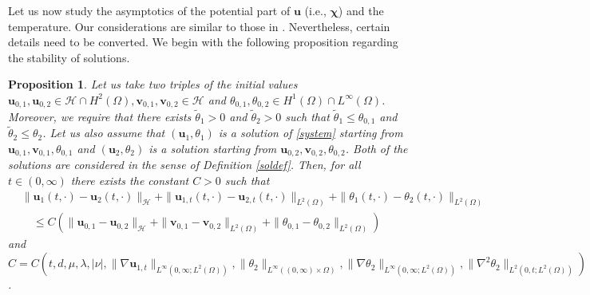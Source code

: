 \documentclass[11pt]{article}
\numberwithin{equation}{section}
\theoremstyle{plain}
\newtheorem{prop}[defi]{Proposition}
\newcommand\bb[1]{\mathbf{#1}}
\newcommand{\tn}{\Omega}
\newcommand{\htwo}{H^2(\Omega)}
\renewcommand{\hom}{H^1(\tn)}
\newcommand{\ld}{L^2(\Omega)}
\newcommand{\bu}{\bb{u}}
\newcommand{\bs}[1]{\boldsymbol{#1}}
\renewcommand{\H}{\mathcal{H}}
\begin{document}
Let us now study the asymptotics of the potential part of $\bu$ (i.e., $\bs\chi$) and the temperature. Our considerations are similar to those in \cite{BC2, Biest}. Nevertheless, certain details need to be converted. We begin with the following proposition regarding the stability of solutions.
\begin{prop}\label{twcontdep}
Let us take two triples of the initial values $\bu_{0,1},\bu_{0,2}\in \H\cap\htwo, \bb v_{0,1},\bb v_{0,2}\in\H$ and $\theta_{0,1},\theta_{0,2}\in\hom\cap L^{\infty}(\tn)$. Moreover, we  require that there exists $\tilde\theta_1>0$ and $\tilde\theta_2>0$ such that $\tilde\theta_1\leq\theta_{0,1}$ and $\tilde\theta_2\leq\theta_2$.
Let us also assume that $(\bu_1,\theta_1)$ is a solution of \eqref{system} starting from $\bu_{0,1},\bb v_{0,1},\theta_{0,1}$ and $(\bu_2,\theta_2)$ is a
solution starting from $\bu_{0,2},\bb v_{0,2},\theta_{0,2}$. Both of the solutions are considered in the sense of Definition \ref{soldef}. Then, for all $t\in(0,\infty)$ there exists the constant $C>0$  such that
\begin{align*}
&\|\bu_1(t,\cdot)-\bu_2(t,\cdot)\|_{\H}+\|\bu_{1,t}(t,\cdot)-\bu_{2,t}(t,\cdot)\|_{\ld}+\|\theta_1(t,\cdot)-\theta_2(t,\cdot)\|_{\ld}\\
&\quad\leq C\left(\|\bu_{0,1}-\bu_{0,2}\|_{\H}+\|\bb v_{0,1}-\bb v_{0,2}\|_{\ld}+\|\theta_{0,1}-\theta_{0,2}\|_{\ld}\right)
\end{align*}
and $C=C(t,d,\mu,\lambda,|\nu|, \|\nabla \bu_{1,t}\|_{L^{\infty}(0,\infty;\ld)},\|\theta_2\|_{L^{\infty}((0,\infty)\times\tn)},\|\nabla \theta_2\|_{L^{\infty}(0,\infty;\ld)}, \|\nabla^2\theta_2\|_{L^2(0,t;\ld)})$.
\end{prop}
\end{document}
